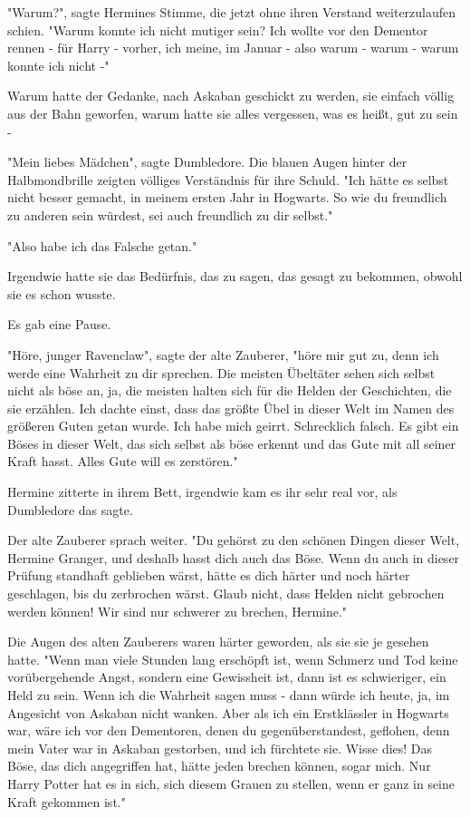 {"Warum?", sagte Hermines Stimme, die jetzt ohne ihren Verstand weiterzulaufen schien. "Warum konnte ich nicht mutiger sein? Ich wollte vor den Dementor rennen - für Harry - vorher, ich meine, im Januar - also warum - warum - warum konnte ich nicht -"

Warum hatte der Gedanke, nach Askaban geschickt zu werden, sie einfach völlig aus der Bahn geworfen, warum hatte sie alles vergessen, was es heißt, gut zu sein -

"Mein liebes Mädchen", sagte Dumbledore. Die blauen Augen hinter der Halbmondbrille zeigten völliges Verständnis für ihre Schuld. "Ich hätte es selbst nicht besser gemacht, in meinem ersten Jahr in Hogwarts. So wie du freundlich zu anderen sein würdest, sei auch freundlich zu dir selbst."

"Also habe ich das Falsche getan."

Irgendwie hatte sie das Bedürfnis, das zu sagen, das gesagt zu bekommen, obwohl sie es schon wusste.

Es gab eine Pause.

"Höre, junger Ravenclaw", sagte der alte Zauberer, "höre mir gut zu, denn ich werde eine Wahrheit zu dir sprechen. Die meisten Übeltäter sehen sich selbst nicht als böse an, ja, die meisten halten sich für die Helden der Geschichten, die sie erzählen. Ich dachte einst, dass das größte Übel in dieser Welt im Namen des größeren Guten getan wurde. Ich habe mich geirrt. Schrecklich falsch. Es gibt ein Böses in dieser Welt, das sich selbst als böse erkennt und das Gute mit all seiner Kraft hasst. Alles Gute will es zerstören."

Hermine zitterte in ihrem Bett, irgendwie kam es ihr sehr real vor, als Dumbledore das sagte.

Der alte Zauberer sprach weiter. "Du gehörst zu den schönen Dingen dieser Welt, Hermine Granger, und deshalb hasst dich auch das Böse. Wenn du auch in dieser Prüfung standhaft geblieben wärst, hätte es dich härter und noch härter geschlagen, bis du zerbrochen wärst. Glaub nicht, dass Helden nicht gebrochen werden können! Wir sind nur schwerer zu brechen, Hermine."

Die Augen des alten Zauberers waren härter geworden, als sie sie je gesehen hatte. "Wenn man viele Stunden lang erschöpft ist, wenn Schmerz und Tod keine vorübergehende Angst, sondern eine Gewissheit ist, dann ist es schwieriger, ein Held zu sein. Wenn ich die Wahrheit sagen muss - dann würde ich heute, ja, im Angesicht von Askaban nicht wanken. Aber als ich ein Erstklässler in Hogwarts war, wäre ich vor den Dementoren, denen du gegenüberstandest, geflohen, denn mein Vater war in Askaban gestorben, und ich fürchtete sie. Wisse dies! Das Böse, das dich angegriffen hat, hätte jeden brechen können, sogar mich. Nur Harry Potter hat es in sich, sich diesem Grauen zu stellen, wenn er ganz in seine Kraft gekommen ist."

}
